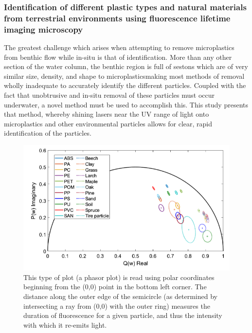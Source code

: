 \documentclass[fleqn,10pt]{SelfArx} %
\begin{document}
	\subsubsection*{ Identification of different plastic types and natural materials from terrestrial environments using fluorescence lifetime imaging microscopy}
	The greatest challenge which arises when attempting to remove microplastics from benthic flow while in-situ is that of identification. More than any other section of the water column, the benthic region is full of sestons which are of very similar size, density, and shape to microplastics\textemdash making most methods of removal wholly inadequate to accurately identify the different particles. Coupled with the fact that unobtrusive and in-situ removal of these particles must occur underwater, a novel method must be used to accomplish this. This study presents that method, whereby shining lasers near the UV range of light onto microplastics and other environmental particles allows for clear, rapid identification of the particles.
	\begin{figure}[h]
		\centering
		\includegraphics[width=1\linewidth]{Figures/Phasor.png}
		\caption[Phasor Plot \textemdash MPs and Organics]{This type of plot (a phasor plot) is read using polar coordinates beginning from the (0,0) point in the bottom left corner. The distance along the outer edge of the semicircle (as determined by intersecting a ray from (0,0) with the outer ring) measures the duration of fluorescence for a given particle, and thus the intensity with which it re-emits light.}
		\label{fig:Phasor}
	\end{figure}
\end{document}
